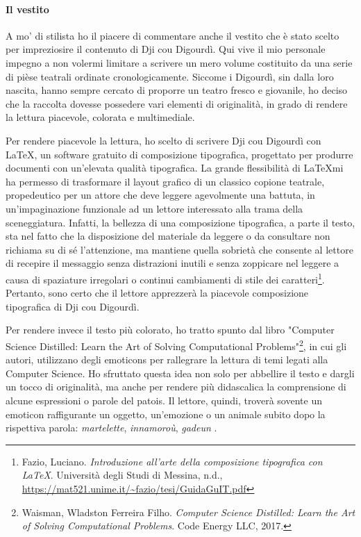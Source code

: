 \paragraph*{Il vestito}
A mo' di stilista ho il piacere di commentare anche il vestito che è stato scelto per impreziosire il contenuto di Dji cou Digourdì. Qui vive il mio personale impegno a non volermi limitare a scrivere un mero volume costituito da  una serie di pièse teatrali ordinate cronologicamente. Siccome i Digourdì, sin dalla loro nascita, hanno sempre cercato di proporre un teatro fresco e giovanile, ho deciso che la raccolta dovesse possedere vari elementi di originalità, in grado di rendere la lettura piacevole, colorata e multimediale.

Per rendere piacevole la lettura, ho scelto di scrivere Dji cou Digourdì con \LaTeX, un software gratuito di composizione tipografica, progettato per produrre documenti con un'elevata qualità tipografica. La grande flessibilità di \LaTeX mi ha permesso di trasformare il layout grafico di un classico copione teatrale, propedeutico per un attore che deve leggere agevolmente una battuta, in un'impaginazione funzionale ad un lettore interessato alla trama della sceneggiatura. Infatti, la bellezza di una composizione tipografica, a parte il testo, sta nel fatto che la disposizione del materiale da leggere o da consultare non richiama su di sé l’attenzione, ma mantiene quella sobrietà che consente al lettore di recepire il messaggio senza distrazioni inutili e senza zoppicare nel leggere a causa di spaziature irregolari o continui cambiamenti di stile dei caratteri\footnote{ Fazio, Luciano. \textit{Introduzione all'arte della composizione tipografica con LaTeX}. Università degli Studi di Messina, n.d., \url{https://mat521.unime.it/~fazio/tesi/GuidaGuIT.pdf}}. Pertanto, sono certo che il lettore apprezzerà la piacevole composizione tipografica di Dji cou Digourdì.

Per rendere invece il testo più colorato, ho tratto spunto dal libro "Computer Science Distilled: Learn the Art of Solving Computational Problems"\footnote{ Waisman, Wladston Ferreira Filho. \textit{Computer Science Distilled: Learn the Art of Solving Computational Problems}. Code Energy LLC, 2017.}, in cui gli autori, utilizzano degli emoticons per rallegrare la lettura di temi legati alla Computer Science. Ho sfruttato questa idea non solo per abbellire il testo e dargli un tocco di originalità, ma anche  per rendere più didascalica la comprensione di alcune espressioni o parole del patois. Il lettore, quindi, troverà sovente un emoticon raffigurante un oggetto, un'emozione o un animale subito dopo la rispettiva parola: \textit{martelette}\martello, \textit{innamoroù}\inamourou , \textit{gadeun} \gadeun .

